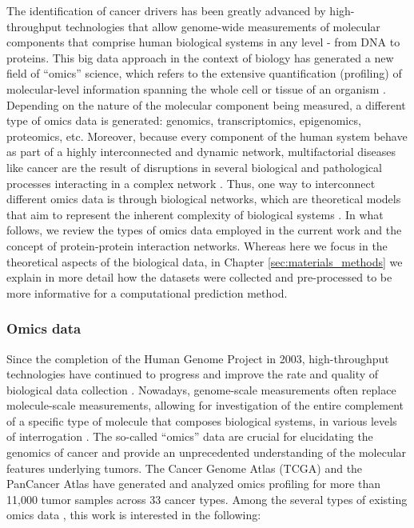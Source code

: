 The identification of cancer drivers has been greatly advanced by high-throughput technologies that allow genome-wide measurements of molecular components that comprise human biological systems in any level - from DNA to proteins. This big data approach in the context of biology has generated a new field of ``omics'' science, which refers to the extensive quantification (\ie profiling) of molecular-level information spanning the whole cell or tissue of an organism \cite{li2014big}. Depending on the nature of the molecular component being measured, a different type of omics data is generated:  genomics, transcriptomics, epigenomics, proteomics, etc.  Moreover, because every component of the human system behave as part of a highly interconnected and dynamic network, multifactorial diseases like cancer are the result of disruptions in several biological and pathological processes interacting in a complex network \cite{barabasi2011network}. Thus, one way to interconnect different omics data is through biological networks, which are theoretical models that aim to represent the inherent complexity of biological systems \cite{liu2020computational}. In what follows, we review the types of omics data employed in the current work and the concept of protein-protein interaction networks. Whereas here we focus in the theoretical aspects of the biological data, in Chapter \ref{sec:materials_methods} we explain in more detail how the datasets were collected and pre-processed to be more informative for a computational prediction method.


\subsubsection{Omics data}

Since the completion of the Human Genome Project in 2003, high-throughput technologies have continued to progress and improve the rate and quality of biological data collection \cite{robinson2016integrative}. Nowadays, genome-scale measurements often replace molecule-scale measurements, allowing for investigation of the entire complement of a specific type of molecule that composes biological systems, in various levels of interrogation \cite{karczewski2018integrative}. The so-called ``omics'' data are crucial for elucidating the genomics of cancer and provide an unprecedented understanding of the molecular features underlying tumors. The Cancer Genome Atlas (TCGA) and the PanCancer Atlas have generated and analyzed omics profiling for more than 11,000 tumor samples across 33 cancer types. Among the several types of existing omics data \cite{karczewski2018integrative}, this work is interested in the following:

